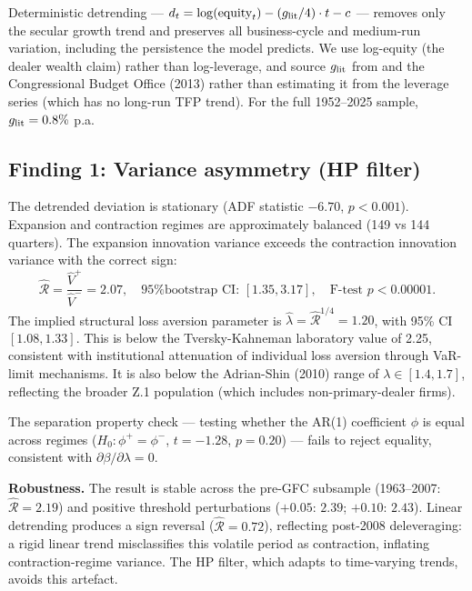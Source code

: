 \documentclass[12pt,a4paper]{article}
\theoremstyle{definition}
\begin{document}
Deterministic detrending --- $d_t = \log(\text{equity}_t) - (g_{\rm
lit}/4) \cdot t - c$ --- removes only the secular growth trend and
preserves all business-cycle and medium-run variation, including the
persistence the model predicts. We use log-equity (the dealer wealth
claim) rather than log-leverage, and source $g_{\rm lit}$ from
\citet{fernald2015} and the Congressional Budget Office (2013) rather
than estimating it from the leverage series (which has no long-run TFP
trend). For the full 1952--2025 sample, $g_{\rm lit} = 0.8\%$ p.a.

\subsection{Finding 1: Variance asymmetry (HP filter)}
\label{sec:finding1}

The detrended deviation is stationary (ADF statistic $-6.70$,
$p < 0.001$). Expansion and contraction regimes are approximately
balanced (149 vs 144 quarters). The expansion innovation variance
exceeds the contraction innovation variance with the correct sign:
\begin{equation}
  \hat{\mathcal{R}} = \frac{\hat{V}^+}{\hat{V}^-} = 2.07, \quad
  \text{95\% bootstrap CI: } [1.35, 3.17], \quad
  \text{F-test } p < 0.00001.
  \label{eq:test1_R}
\end{equation}
The implied structural loss aversion parameter is
$\hat{\lambda} = \hat{\mathcal{R}}^{1/4} = 1.20$, with 95\% CI
$[1.08, 1.33]$. This is below the Tversky-Kahneman laboratory value
of 2.25, consistent with institutional attenuation of individual loss
aversion through VaR-limit mechanisms. It is also below the
Adrian-Shin (2010) range of $\lambda \in [1.4, 1.7]$, reflecting the
broader Z.1 population (which includes non-primary-dealer firms).

The separation property check --- testing whether the AR(1)
coefficient $\phi$ is equal across regimes ($H_0\!: \phi^+ = \phi^-$,
$t = -1.28$, $p = 0.20$) --- fails to reject equality, consistent
with $\partial\beta/\partial\lambda = 0$.

\noindent\textbf{Robustness.} The result is stable across the pre-GFC
subsample (1963--2007: $\hat{\mathcal{R}} = 2.19$) and positive
threshold perturbations ($+0.05$: $2.39$; $+0.10$: $2.43$). Linear
detrending produces a sign reversal ($\hat{\mathcal{R}} = 0.72$),
reflecting post-2008 deleveraging: a rigid linear trend misclassifies
this volatile period as contraction, inflating contraction-regime
variance. The HP filter, which adapts to time-varying trends, avoids
this artefact.
\end{document}
